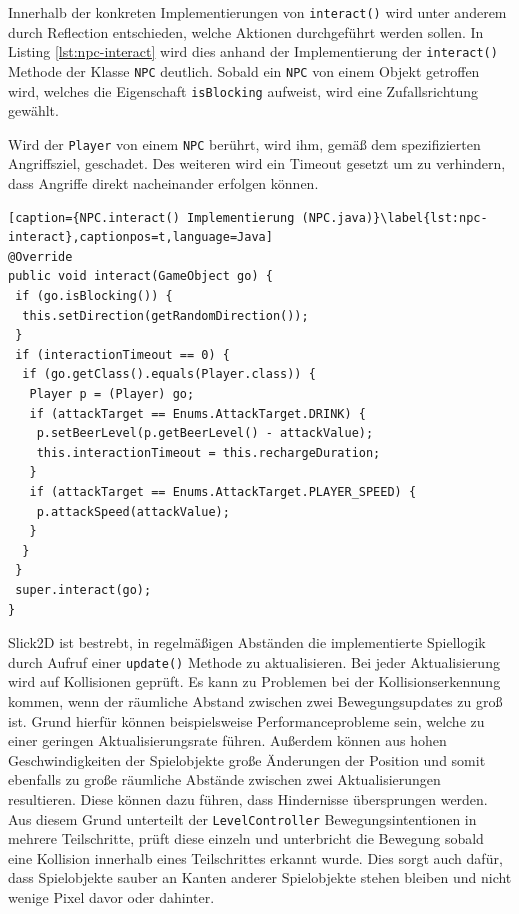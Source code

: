 Innerhalb der konkreten Implementierungen von \texttt{interact()} wird unter anderem durch Reflection entschieden, welche Aktionen durchgeführt werden sollen.
In Listing \ref{lst:npc-interact} wird dies anhand der Implementierung der \texttt{interact()} Methode der Klasse \texttt{NPC} deutlich.
Sobald ein \texttt{NPC} von einem Objekt getroffen wird, welches die Eigenschaft \texttt{isBlocking} aufweist, wird eine Zufallsrichtung gewählt.

Wird der \texttt{Player} von einem \texttt{NPC} berührt, wird ihm, gemäß dem spezifizierten Angriffsziel, geschadet.
Des weiteren wird ein Timeout gesetzt um zu verhindern, dass Angriffe direkt nacheinander erfolgen können.

\begin{lstlisting}[caption={NPC.interact() Implementierung (NPC.java)}\label{lst:npc-interact},captionpos=t,language=Java]
@Override
public void interact(GameObject go) {
 if (go.isBlocking()) {
  this.setDirection(getRandomDirection());
 }
 if (interactionTimeout == 0) {
  if (go.getClass().equals(Player.class)) {
   Player p = (Player) go;
   if (attackTarget == Enums.AttackTarget.DRINK) {
    p.setBeerLevel(p.getBeerLevel() - attackValue);
    this.interactionTimeout = this.rechargeDuration;
   }
   if (attackTarget == Enums.AttackTarget.PLAYER_SPEED) {
    p.attackSpeed(attackValue);
   }
  }
 }
 super.interact(go);
}

\end{lstlisting}

Slick2D ist bestrebt, in regelmäßigen Abständen die implementierte Spiellogik durch Aufruf einer \texttt{update()} Methode zu aktualisieren.
Bei jeder Aktualisierung wird auf Kollisionen geprüft.
Es kann zu Problemen bei der Kollisionserkennung kommen, wenn der räumliche Abstand zwischen zwei Bewegungsupdates zu groß ist.
Grund hierfür können beispielsweise Performanceprobleme sein, welche zu einer geringen Aktualisierungsrate führen.
Außerdem können aus hohen Geschwindigkeiten der Spielobjekte große Änderungen der Position und somit ebenfalls zu große räumliche Abstände zwischen zwei Aktualisierungen resultieren.
Diese können dazu führen, dass Hindernisse übersprungen werden.
Aus diesem Grund unterteilt der \texttt{LevelController} Bewegungsintentionen in mehrere Teilschritte, prüft diese einzeln und unterbricht die Bewegung sobald eine Kollision innerhalb eines Teilschrittes erkannt wurde.
Dies sorgt auch dafür, dass Spielobjekte sauber an Kanten anderer Spielobjekte stehen bleiben und nicht wenige Pixel davor oder dahinter.

